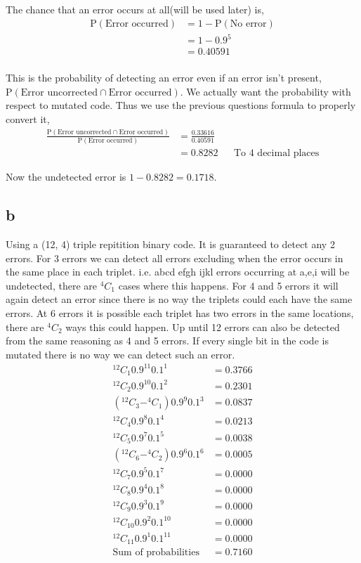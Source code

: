 \documentclass{article}
\begin{document}
The chance that an error occurs at all(will be used later) is,
\begin{align*}
    \text{P}(\text{Error occurred}) &= 1 - \text{P}(\text{No error}) \\
    &= 1 - 0.9^5 \\
    &= 0.40591 \\
\end{align*}

This is the probability of detecting an error even if an error isn't present,
$\text{P}(\text{Error uncorrected} \cap \text{Error occurred})$.
We actually want the probability with respect to mutated code. Thus we use the
previous questions formula to properly convert it,
\begin{align*}
    \frac{\text{P}(\text{Error uncorrected} \cap \text{Error occurred})}
    {\text{P}(\text{Error occurred})}
    &= \frac{0.33616}{0.40591} \\
    &= 0.8282 && \text{To 4 decimal places}
\end{align*}

Now the undetected error is $1 - 0.8282 = 0.1718$.

\subsection{b}
Using a (12, 4) triple repitition binary code. It is guaranteed to detect any
2 errors. For 3 errors we can detect all errors excluding when the error occurs
in the same place in each triplet. i.e. abcd efgh ijkl errors occurring at
a,e,i will be undetected, there are $^4C_1$ cases where this happens.
For 4 and 5 errors it will again detect an error
since there is no way the triplets could each have the same errors. At 6 errors
it is possible each triplet has two errors in the same locations, there are
$^4C_2$ ways this could happen. Up until 12 errors can also be detected from
the same reasoning as 4 and 5 errors. If every single bit in the code is
mutated there is no way we can detect such an error.
\begin{align*}
    ^12C_1 0.9^{11} 0.1^1 &= 0.3766 \\
    ^12C_2 0.9^{10} 0.1^2 &= 0.2301 \\
    (^12C_3 - ^4C_1) 0.9^9 0.1^3 &= 0.0837 \\
    ^12C_4 0.9^8 0.1^4 &= 0.0213 \\
    ^12C_5 0.9^7 0.1^5 &= 0.0038 \\
    (^12C_6 - ^4C_2) 0.9^6 0.1^6 &= 0.0005 \\
    ^12C_7 0.9^5 0.1^7 &= 0.0000 \\
    ^12C_8 0.9^4 0.1^8 &= 0.0000 \\
    ^12C_9 0.9^3 0.1^9 &= 0.0000 \\
    ^12C_{10} 0.9^2 0.1^{10} &= 0.0000 \\
    ^12C_{11} 0.9^1 0.1^{11} &= 0.0000 \\
    \text{Sum of probabilities} &= 0.7160 \\
\end{align*}
\end{document}
